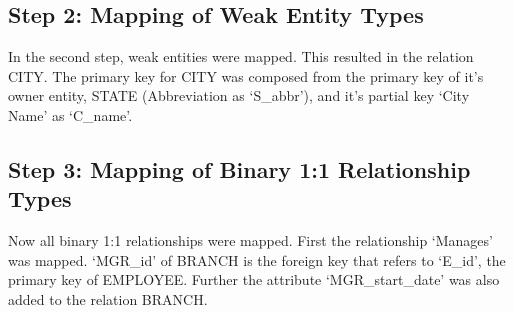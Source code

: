 \documentclass[a4paper,11pt,twoside]{article}
\begin{document}
\subsection*{Step 2: Mapping of Weak Entity Types}
In the second step, weak entities were mapped. This resulted in the relation CITY. The primary key for CITY was composed from the primary key of it's owner entity, STATE (Abbreviation as `S\_abbr'), and it's partial key `City Name' as `C\_name'.

\vspace{0.3cm}
\vspace{0.3cm}

\subsection*{Step 3: Mapping of Binary 1:1 Relationship Types}
Now all binary 1:1 relationships were mapped. First the relationship `Manages' was mapped. `MGR\_id' of BRANCH is the foreign key that refers to `E\_id', the primary key of EMPLOYEE. Further the attribute `MGR\_start\_date' was also added to the relation BRANCH. 
\end{document}
